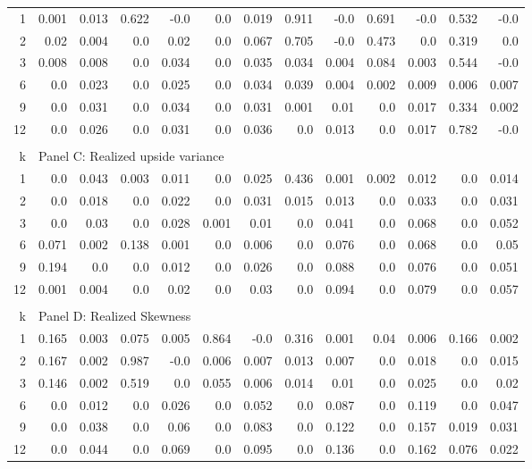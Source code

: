 \begin{small}
\begin{table}[h]
\begin{center}
\begin{tabular}{@{\extracolsep{6pt}}rrrrrrrrrrrrr@{}}
1 & 0.001 & 0.013 & 0.622 & -0.0 & 0.0 & 0.019 & 0.911 & -0.0 & 0.691 & -0.0 & 0.532 & -0.0 \\[6pt]
2 & 0.02 & 0.004 & 0.0 & 0.02 & 0.0 & 0.067 & 0.705 & -0.0 & 0.473 & 0.0 & 0.319 & 0.0 \\[6pt]
3 & 0.008 & 0.008 & 0.0 & 0.034 & 0.0 & 0.035 & 0.034 & 0.004 & 0.084 & 0.003 & 0.544 & -0.0 \\[6pt]
6 & 0.0 & 0.023 & 0.0 & 0.025 & 0.0 & 0.034 & 0.039 & 0.004 & 0.002 & 0.009 & 0.006 & 0.007 \\[6pt]
9 & 0.0 & 0.031 & 0.0 & 0.034 & 0.0 & 0.031 & 0.001 & 0.01 & 0.0 & 0.017 & 0.334 & 0.002 \\[6pt]
12 & 0.0 & 0.026 & 0.0 & 0.031 & 0.0 & 0.036 & 0.0 & 0.013 & 0.0 & 0.017 & 0.782 & -0.0 \\[6pt]


\hline\\[0.000000001pt]

k & \multicolumn{12}{l}{Panel C: Realized upside variance} \\[7pt]

\hline

1 & 0.0 & 0.043 & 0.003 & 0.011 & 0.0 & 0.025 & 0.436 & 0.001 & 0.002 & 0.012 & 0.0 & 0.014 \\[6pt]
2 & 0.0 & 0.018 & 0.0 & 0.022 & 0.0 & 0.031 & 0.015 & 0.013 & 0.0 & 0.033 & 0.0 & 0.031 \\[6pt]
3 & 0.0 & 0.03 & 0.0 & 0.028 & 0.001 & 0.01 & 0.0 & 0.041 & 0.0 & 0.068 & 0.0 & 0.052 \\[6pt]
6 & 0.071 & 0.002 & 0.138 & 0.001 & 0.0 & 0.006 & 0.0 & 0.076 & 0.0 & 0.068 & 0.0 & 0.05 \\[6pt]
9 & 0.194 & 0.0 & 0.0 & 0.012 & 0.0 & 0.026 & 0.0 & 0.088 & 0.0 & 0.076 & 0.0 & 0.051 \\[6pt]
12 & 0.001 & 0.004 & 0.0 & 0.02 & 0.0 & 0.03 & 0.0 & 0.094 & 0.0 & 0.079 & 0.0 & 0.057 \\[6pt]


\hline\\[0.000000001pt]

k & \multicolumn{12}{l}{Panel D: Realized Skewness} \\[7pt]

\hline

1 & 0.165 & 0.003 & 0.075 & 0.005 & 0.864 & -0.0 & 0.316 & 0.001 & 0.04 & 0.006 & 0.166 & 0.002 \\[6pt]
2 & 0.167 & 0.002 & 0.987 & -0.0 & 0.006 & 0.007 & 0.013 & 0.007 & 0.0 & 0.018 & 0.0 & 0.015 \\[6pt]
3 & 0.146 & 0.002 & 0.519 & 0.0 & 0.055 & 0.006 & 0.014 & 0.01 & 0.0 & 0.025 & 0.0 & 0.02 \\[6pt]
6 & 0.0 & 0.012 & 0.0 & 0.026 & 0.0 & 0.052 & 0.0 & 0.087 & 0.0 & 0.119 & 0.0 & 0.047 \\[6pt]
9 & 0.0 & 0.038 & 0.0 & 0.06 & 0.0 & 0.083 & 0.0 & 0.122 & 0.0 & 0.157 & 0.019 & 0.031 \\[6pt]
12 & 0.0 & 0.044 & 0.0 & 0.069 & 0.0 & 0.095 & 0.0 & 0.136 & 0.0 & 0.162 & 0.076 & 0.022 \\[6pt]



\end{tabular}
\end{center}
\end{table}
\end{small}
